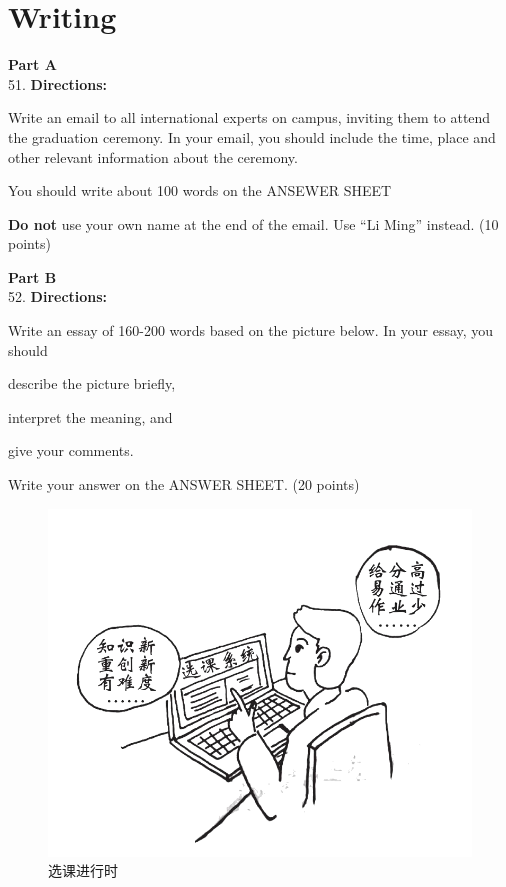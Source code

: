 \newpage
\section{Writing}


\noindent
\textbf{Part A}\\
51. \textbf{Directions:}

Write an email to all international experts on campus, inviting them to
attend the graduation ceremony. In your email, you should include the
time, place and other relevant information about the ceremony.

You should write about 100 words on the ANSEWER SHEET

\textbf{Do not} use your own name at the end of the email. Use ``Li
Ming'' instead. (10 points)

\vspace{2em}

\noindent
\textbf{Part B}\\
52. \textbf{Directions:}

Write an essay of 160-200 words based on the picture below. In your
essay, you should
\begin{listwrite}
	\item
describe the picture briefly,

\item 
 interpret the meaning, and

\item 
 give your comments.
\end{listwrite}


Write your answer on the ANSWER SHEET. (20 points)


\begin{figure}[h!]
	\centering
	\includegraphics[width=0.53\linewidth]{picture/2018.png}
	\caption*{选课进行时}
\end{figure}



\checkpagenumber
